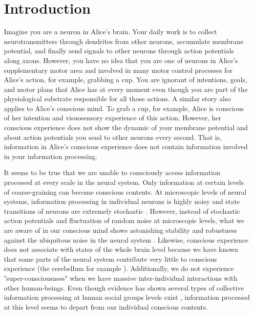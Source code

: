\documentclass[utf8]{article}
\begin{document}

    \newpage
	\section{Introduction}

		Imagine you are a neuron in Alice's brain. Your daily work is to collect neurotransmitters through dendrites from other neurons, accumulate membrane potential, and finally send signals to other neurons through action potentials along axons. However, you have no idea that you are one of neurons in Alice's supplementary motor area and involved in many motor control processes for Alice's action, for example, grabbing a cup. You are ignorant of intentions, goals, and motor plans that Alice has at every moment even though you are part of the physiological substrate responsible for all those actions.
		A similar story also applies to Alice's conscious mind. To grab a cup, for example, Alice is conscious of her intention and visuosensory experience of this action. However, her conscious experience does not show the dynamic of your membrane potential and about action potentials you send to other neurons every second. That is, information in Alice's conscious experience does not contain information involved in your information processing.


		It seems to be true that we are unable to consciously access information processed at every scale in the neural system. Only information at certain levels of coarse-graining can become conscious contents. At microscopic levels of neural systems, information processing in individual neurons is highly noisy and state transitions of neurons are extremely stochastic \citep{Goldwyn2011, White2000}. However, instead of stochastic action potentials and fluctuation of random noise at microscopic levels, what we are aware of in our conscious mind shows astonishing stability and robustness against the ubiquitous noise in the neural system \citep{mathis1995computational}. Likewise, conscious experience does not associate with states of the whole brain level because we have known that some parts of the neural system contribute very little to conscious experience (the cerebellum for example \citep{lemon2010life}). Additionally, we do not  experience "super-consciousness" when we have massive inter-individual interactions with other human-beings. Even though evidence has shown several types of collective information processing at human social groups levels exist \citep{malone2015handbook}, information processed at this level seems to depart from our individual conscious contents.
\end{document}
